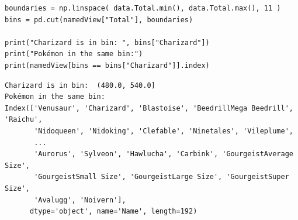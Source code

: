 
\begin{frame}[fragile]
%
\begin{codebox}
\begin{verbatim}
boundaries = np.linspace( data.Total.min(), data.Total.max(), 11 )
bins = pd.cut(namedView["Total"], boundaries)

print("Charizard is in bin: ", bins["Charizard"])
print("Pokémon in the same bin:")
print(namedView[bins == bins["Charizard"]].index)
\end{verbatim}
\end{codebox}
%
\begin{cmdbox}
\begin{verbatim}
Charizard is in bin:  (480.0, 540.0]
Pokémon in the same bin:
Index(['Venusaur', 'Charizard', 'Blastoise', 'BeedrillMega Beedrill', 'Raichu',
       'Nidoqueen', 'Nidoking', 'Clefable', 'Ninetales', 'Vileplume',
       ...
       'Aurorus', 'Sylveon', 'Hawlucha', 'Carbink', 'GourgeistAverage Size',
       'GourgeistSmall Size', 'GourgeistLarge Size', 'GourgeistSuper Size',
       'Avalugg', 'Noivern'],
      dtype='object', name='Name', length=192)
\end{verbatim}
\end{cmdbox}
%
\end{frame}


